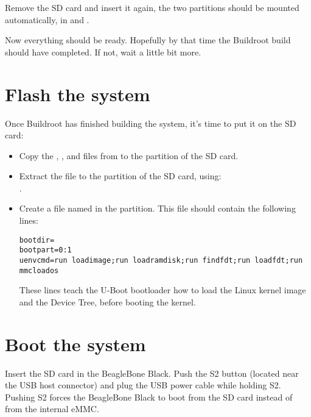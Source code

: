 Remove the SD card and insert it again, the two partitions should be
mounted automatically, in  and
.

Now everything should be ready. Hopefully by that time the Buildroot
build should have completed. If not, wait a little bit more.

\section{Flash the system}

Once Buildroot has finished building the system, it's time to put it
on the SD card:

\begin{itemize}

\item Copy the , ,  and
   files from  to the
   partition of the SD card.

\item Extract the  file to the 
  partition of the SD card, using:\\
  .

\item Create a file named  in the 
  partition. This file should contain the following lines:

{\small
\begin{verbatim}
bootdir=
bootpart=0:1
uenvcmd=run loadimage;run loadramdisk;run findfdt;run loadfdt;run mmcloados
\end{verbatim}
}

  These lines teach the U-Boot bootloader how to load the Linux kernel
  image and the Device Tree, before booting the kernel.

\end{itemize}

\section{Boot the system}

Insert the SD card in the BeagleBone Black. Push the S2 button
(located near the USB host connector) and plug the USB power cable
while holding S2. Pushing S2 forces the BeagleBone Black to boot from
the SD card instead of from the internal eMMC.

